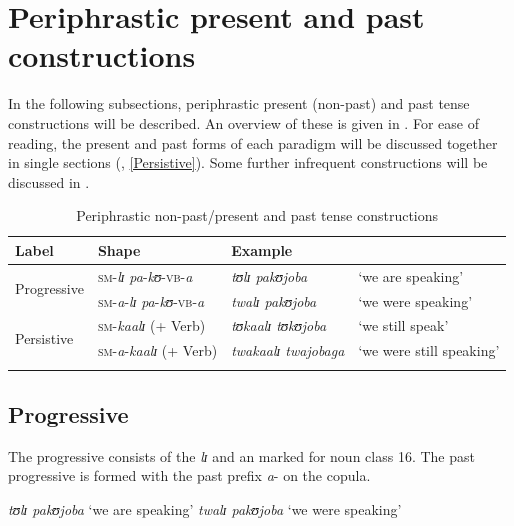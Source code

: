 \section{Periphrastic present and past constructions}
\label{ComplexConstructions}
In the following subsections, periphrastic present (non-past) and past tense constructions will be described. An overview of these is given in . For ease of reading, the present and past forms of each paradigm will be discussed together in single sections (, \ref{Persistive}). Some further infrequent constructions will be discussed in .

\begin{table}[H]
\setlength{\tabcolsep}{2pt}
\begin{tabularx}{\textwidth}{llll}
\lsptoprule
\footnotesize{Label} & \footnotesize{Shape} & \footnotesize{Example}\\
\midrule 
\multirow{2}{*}{Progressive} & \textsc{sm}-\textit{lɪ} \textit{pa}-\textit{kʊ}-\textsc{vb}-\textit{a} & \textit{tʊlɪ pakʊjoba} & \lq we are speaking' \\  
& \textsc{sm}-\textit{a}-\textit{lɪ} \textit{pa}-\textit{kʊ}-\textsc{vb}-\textit{a} & \textit{twalɪ pakʊjoba} & \lq we were speaking'\\ 
\multirow{2}{*}{Persistive} & \textsc{sm}-\textit{kaalɪ} (+ Verb) & \textit{tʊkaalɪ tʊkʊjoba} & \lq we still speak'\\ 
 & \textsc{sm}-\textit{a}-\textit{kaalɪ} (+ Verb) & \textit{twakaalɪ twajobaga} & \lq we were still speaking'\\
\lspbottomrule  
\end{tabularx}
\caption{Periphrastic non-past/present and past tense constructions}\label{TableComplexConstructions}
\end{table}

\subsection{Progressive}\label{Progressive}
The progressive consists of the  \textit{lɪ} and an  marked for  noun class 16. The past progressive is formed with the past prefix \textit{a}- on the copula.
\begin{exe}
\ex
\begin{xlist}
\ex \textit{tʊlɪ pakʊjoba} \lq we are speaking'
\ex \textit{twalɪ pakʊjoba} \lq we were speaking'
\end{xlist}
\end{exe}

